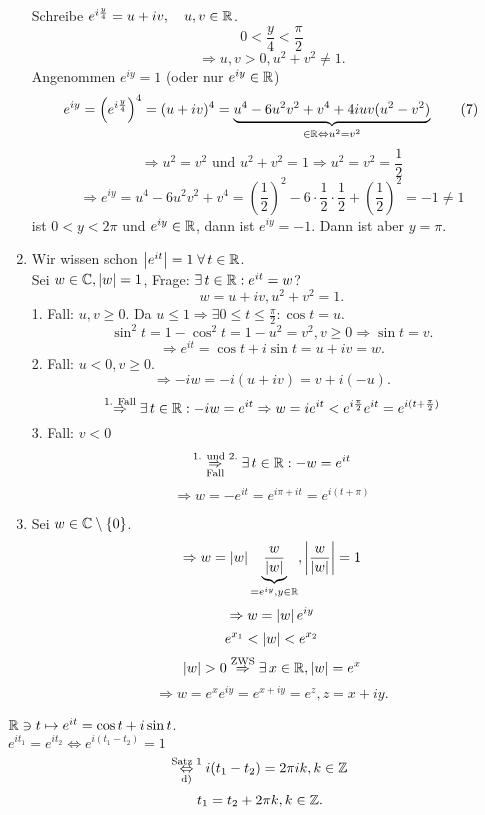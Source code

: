 \documentclass[../ana2.tex]{subfiles}
\begin{document}
\begin{bew}
\begin{enumerate}[label=(\alph*)]
Schreibe \( e^{i \frac{y}{4}} = u + iv, \quad u,v\in\mathbb{R} \).\\
\[ 0 < \frac{y}{4} < \frac{\pi}{2} \]
\[ \Rightarrow u,v > 0, u^2 + v^2 \neq 1. \]
Angenommen \( e^{iy} = 1 \) (oder nur \( e^{iy} \in \mathbb{R} \))
\[ e^{iy} = \left( e^{i \frac{y}{4}} \right)^4 
= (u+iv)^4 = \underbrace{u^4 - 6u^2 v^2 + v^4 + 4iuv(u^2 - v^2)}_{
    \in \mathbb{R} \Leftrightarrow u^2 = v^2 
} \tag{7} \]
\[ \Rightarrow u^2 = v^2 \text{ und } u^2+v^2 
= 1 \Rightarrow u^2 = v^2 = \frac{1}{2} \]
\[ \Rightarrow e^{iy} = u^4 - 6u^2v^2+v^4 
= \left(\frac{1}{2}\right)^2 - 6 \cdot \frac{1}{2} \cdot \frac{1}{2}
+ \left(\frac{1}{2}\right)^2 = -1 \neq 1 \]
\Dphp{} ist \( 0 < y < 2\pi \) und \( e^{iy} \in \mathbb{R} \), 
dann ist \( e^{iy} = -1 \). Dann ist aber \( y = \pi \).
\item Wir wissen schon \( \abs{e^{it}} = 1 \;\forall t \in\R \).\\
Sei \( w\in\mathbb{C}, \left|w\right| = 1 \), Frage: \( \exists t \in \R: e^{it} = w \)?\\
\[ w = u + iv, u^2 + v^2 = 1. \]
1. Fall: 
\( u, v \geq 0 \). Da \( u \leq 1 \Rightarrow 
\exists 0 \leq t \leq \frac{\pi}{2}: \cos t = u. \)
\[ \sin^2 t = 1 - \cos^2 t = 1 - u^2 = v^2, v \geq 0 
\Rightarrow \sin t = v. \]
\[ \Rightarrow e^{it} = \cos t + i \sin t = u + iv = w. \]
2. Fall: 
\( u < 0, v \geq 0 \). 
\[ \Rightarrow -i w = -i (u + iv) = v + i(-u). \]
\[ \oversett{1. Fall}{\Rightarrow} \exists t \in \R: 
-i w = e^{it} \Rightarrow w = i e^{it} < e^{i \frac{\pi}{2}} e^{it} 
= e^{i(t + \frac{\pi}{2})} \]
3. Fall: \( v < 0 \)
\[ \overundersett{1. und 2.}{Fall}{\Rightarrow} \exists t \in \R: -w = e^{it} \]
\[ \Rightarrow w = -e^{it} = e^{i\pi + it} = e^{i(t+\pi)} \]

\item Sei \( w \in \mathbb{C} \setminus \{0\} \).
\[ \Rightarrow w = \left|w\right| \underbrace{\frac{w}{\left|w\right|}}_{
    =e^{iy}, y\in\mathbb{R}}, 
\left|\frac{w}{\left|w\right|}\right| = 1 \]
\[ \Rightarrow w = \left|w\right| e^{iy} \]
\[ e^{x_1} < \left|w\right| < e^{x_2} \]
\[ \abs{w} > 0 \oversett{ZWS}{\Rightarrow} 
\exists x \in \R, \abs{w} = e^x \]
\[ \Rightarrow w = e^x e^{iy} = e^{x + iy} = e^z, 
z = x + iy. \]
\end{enumerate}
\end{bew}
\begin{bem}
    \( \mathbb{R} \ni t \mapsto e^{it} = \cos t + i \sin t \).\\
    \( e^{i t_1} = e^{i t_2} 
    \Leftrightarrow e^{i(t_1 - t_2)} = 1 \)
    \[ \overset{\text{Satz 1}}{\underset{\text{d)}}{\Leftrightarrow}} 
    i (t_1 - t_2) = 2 \pi i k, k\in\mathbb{Z} \]
    \[ t_1 = t_2 + 2\pi k, k\in\mathbb{Z}. \]
\end{bem}
\end{document}
